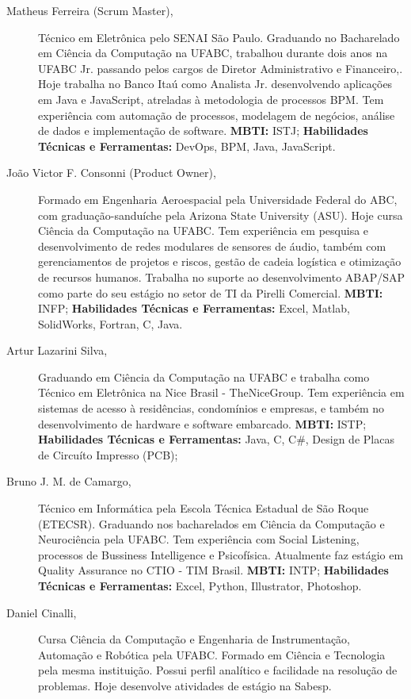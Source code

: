 \documentclass[12pt]{article}
\begin{document}
\begin{description}
\item[Matheus Ferreira (Scrum Master),] Técnico em Eletrônica pelo SENAI São Paulo. Graduando no Bacharelado em Ciência da Computação na UFABC, trabalhou durante dois anos na UFABC Jr. passando pelos cargos de Diretor Administrativo e Financeiro,. Hoje trabalha no Banco Itaú como Analista Jr. desenvolvendo aplicações em Java e JavaScript, atreladas à metodologia de processos BPM. Tem experiência com automação de processos, modelagem de negócios, análise de dados e implementação de software.
\subitem \textbf{MBTI:} ISTJ;
\subitem \textbf{Habilidades Técnicas e Ferramentas: } DevOps, BPM, Java, JavaScript.
\newline
\item[João Victor F. Consonni (Product Owner),] Formado em Engenharia Aeroespacial pela Universidade Federal do ABC, com graduação-sanduíche pela Arizona State University (ASU). Hoje cursa Ciência da Computação na UFABC. Tem experiência em pesquisa  e desenvolvimento de redes modulares de sensores de áudio, também com gerenciamentos de projetos e riscos, gestão de cadeia logística e otimização de recursos humanos. Trabalha no suporte ao desenvolvimento ABAP/SAP como parte do seu estágio no setor de TI da Pirelli Comercial. 
\subitem \textbf{MBTI:} INFP;
\subitem \textbf{Habilidades Técnicas e Ferramentas:} Excel, Matlab, SolidWorks, Fortran, C, Java.
\newline
\item[Artur Lazarini Silva,] Graduando em Ciência da Computação na UFABC e trabalha como Técnico em Eletrônica na Nice Brasil - TheNiceGroup. Tem experiência em sistemas de acesso à residências, condomínios e empresas, e também no desenvolvimento de hardware e software embarcado.
\subitem \textbf{MBTI:} ISTP;
\subitem \textbf{Habilidades Técnicas e Ferramentas:} Java, C, C\#, Design de Placas de Circuíto Impresso (PCB);
\newline
\item[Bruno J. M. de Camargo,] Técnico em Informática pela Escola Técnica Estadual de São Roque (ETECSR). Graduando nos bacharelados em Ciência da Computação e Neurociência pela UFABC. Tem experiência com Social Listening, processos de Bussiness Intelligence e Psicofísica. Atualmente faz estágio em Quality Assurance no CTIO - TIM Brasil. 
\subitem \textbf{MBTI:} INTP;
\subitem \textbf{Habilidades Técnicas e Ferramentas:} Excel, Python, Illustrator, Photoshop.
\newline
\item[Daniel Cinalli,]  Cursa Ciência da Computação e Engenharia de Instrumentação, Automação e Robótica pela UFABC. Formado em Ciência e Tecnologia pela mesma instituição. Possui perfil analítico e facilidade na resolução de problemas. Hoje desenvolve atividades de estágio na Sabesp. 

\end{description}
\end{document}
